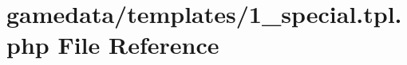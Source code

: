 \hypertarget{1__special_8tpl_8php}{\section{gamedata/templates/1\+\_\+special.tpl.\+php File Reference}
\label{1__special_8tpl_8php}
}
